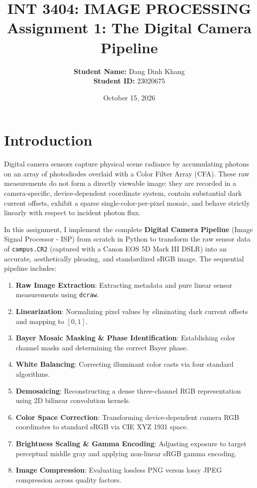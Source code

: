 \documentclass[a4paper]{article}
\title{
    \textbf{INT 3404: IMAGE PROCESSING} \\
    \vspace{0.5cm}
    \Large \textbf{Assignment 1: The Digital Camera Pipeline}
}
\author{
    \textbf{Student Name: } Dang Dinh Khang \\
    \textbf{Student ID: } 23020675
}
\date{October 15, 2026}
\begin{document}
\maketitle

\section{Introduction}
\label{Introduction}

Digital camera sensors capture physical scene radiance by accumulating photons on an array of photodiodes overlaid with a Color Filter Array (CFA). These raw measurements do not form a directly viewable image: they are recorded in a camera-specific, device-dependent coordinate system, contain substantial dark current offsets, exhibit a sparse single-color-per-pixel mosaic, and behave strictly linearly with respect to incident photon flux.

In this assignment, I implement the complete \textbf{Digital Camera Pipeline} (Image Signal Processor - ISP) from scratch in Python to transform the raw sensor data of \texttt{campus.CR2} (captured with a Canon EOS 5D Mark III DSLR) into an accurate, aesthetically pleasing, and standardized sRGB image. The sequential pipeline includes:
\begin{enumerate}
    \item \textbf{Raw Image Extraction}: Extracting metadata and pure linear sensor measurements using \texttt{dcraw}.
    \item \textbf{Linearization}: Normalizing pixel values by eliminating dark current offsets and mapping to $[0, 1]$.
    \item \textbf{Bayer Mosaic Masking \& Phase Identification}: Establishing color channel masks and determining the correct Bayer phase.
    \item \textbf{White Balancing}: Correcting illuminant color casts via four standard algorithms.
    \item \textbf{Demosaicing}: Reconstructing a dense three-channel RGB representation using 2D bilinear convolution kernels.
    \item \textbf{Color Space Correction}: Transforming device-dependent camera RGB coordinates to standard sRGB via CIE XYZ 1931 space.
    \item \textbf{Brightness Scaling \& Gamma Encoding}: Adjusting exposure to target perceptual middle gray and applying non-linear sRGB gamma encoding.
    \item \textbf{Image Compression}: Evaluating lossless PNG versus lossy JPEG compression across quality factors.
\end{enumerate}
\end{document}

